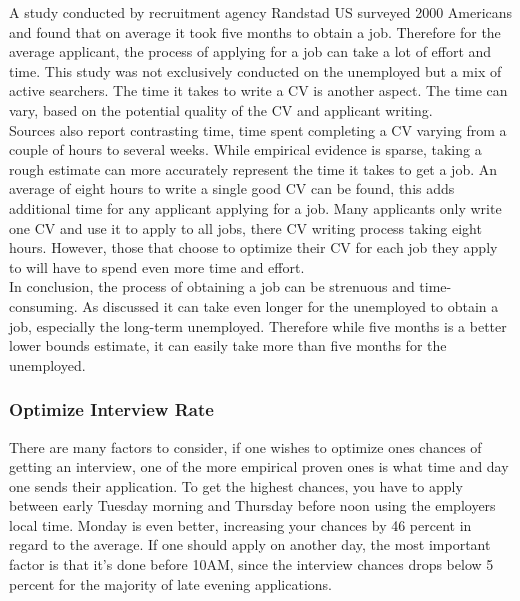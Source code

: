 A study conducted by recruitment agency Randstad US surveyed 2000 Americans and found that on average it took five months to obtain a job.\cite{5_month_for_a_job}
Therefore for the average applicant, the process of applying for a job can take a lot of effort and time.
This study was not exclusively conducted on the unemployed but a mix of active searchers.
The time it takes to write a CV is another aspect.
The time can vary, based on the potential quality of the CV and applicant writing. \\
 
Sources also report contrasting time, time spent completing a CV varying from a couple of hours to several weeks.
While empirical evidence is sparse, taking a rough estimate can more accurately represent the time it takes to get a job.
An average of eight hours to write a single good CV can be found, this adds additional time for any applicant applying for a job.
Many applicants only write one CV and use it to apply to all jobs, there CV writing process taking eight hours.\cite{CV_Using_One}
However, those that choose to optimize their CV for each job they apply to will have to spend even more time and effort. \\

In conclusion, the process of obtaining a job can be strenuous and time-consuming.\cite{Time_spent_writing_CV}
As discussed it can take even longer for the unemployed to obtain a job, especially the long-term unemployed.
Therefore while five months is a better lower bounds estimate, it can easily take more than five months for the unemployed. \\

\subsubsection{Optimize Interview Rate}
There are many factors to consider, if one wishes to optimize ones
chances of getting an interview, one of the more empirical proven ones
is what time and day one sends their application.
To get the highest chances, you have to apply between early Tuesday morning
and Thursday before noon using the employers local time. Monday is even better,
increasing your chances by 46 percent in regard to the average.
If one should apply on another day, the most important factor is that
it's done before 10AM, since the interview chances drops below 5 percent for
the majority of late evening applications.\cite{Best_time_and_date}

